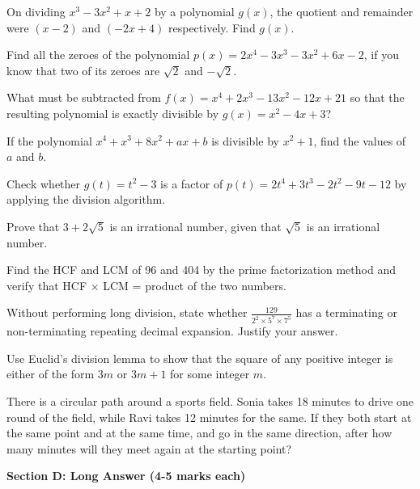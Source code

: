 \documentclass[12pt,a4paper]{exam}
\begin{document}
\begin{questions}
\question[3] On dividing $x^3 - 3x^2 + x + 2$ by a polynomial $g(x)$, the quotient and remainder were $(x - 2)$ and $(-2x + 4)$ respectively. Find $g(x)$.
\vspace{0.15cm}

\question[3] Find all the zeroes of the polynomial $p(x) = 2x^4 - 3x^3 - 3x^2 + 6x - 2$, if you know that two of its zeroes are $\sqrt{2}$ and $-\sqrt{2}$.
\vspace{0.15cm}

\question[3] What must be subtracted from $f(x) = x^4 + 2x^3 - 13x^2 - 12x + 21$ so that the resulting polynomial is exactly divisible by $g(x) = x^2 - 4x + 3$?
\vspace{0.15cm}

\question[3] If the polynomial $x^4 + x^3 + 8x^2 + ax + b$ is divisible by $x^2 + 1$, find the values of $a$ and $b$.
\vspace{0.15cm}

\question[3] Check whether $g(t) = t^2 - 3$ is a factor of $p(t) = 2t^4 + 3t^3 - 2t^2 - 9t - 12$ by applying the division algorithm.
\vspace{0.15cm}

\question[3] Prove that $3 + 2\sqrt{5}$ is an irrational number, given that $\sqrt{5}$ is an irrational number.
\vspace{0.15cm}

\question[3] Find the HCF and LCM of 96 and 404 by the prime factorization method and verify that HCF $\times$ LCM = product of the two numbers.
\vspace{0.15cm}

\question[3] Without performing long division, state whether $\frac{129}{2^2 \times 5^7 \times 7^5}$ has a terminating or non-terminating repeating decimal expansion. Justify your answer.
\vspace{0.15cm}

\question[3] Use Euclid's division lemma to show that the square of any positive integer is either of the form $3m$ or $3m + 1$ for some integer $m$.
\vspace{0.15cm}

\question[3] There is a circular path around a sports field. Sonia takes 18 minutes to drive one round of the field, while Ravi takes 12 minutes for the same. If they both start at the same point and at the same time, and go in the same direction, after how many minutes will they meet again at the starting point?
\vspace{0.15cm}

\end{questions}
\bigskip
\noindent\textbf{\large Section D: Long Answer (4-5 marks each)}
\end{document}
